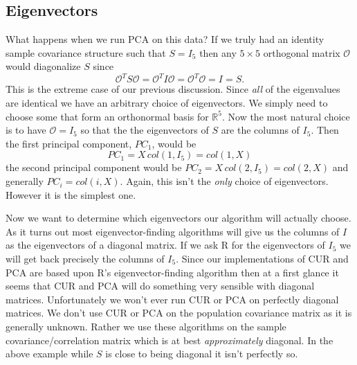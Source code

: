 \documentclass{book}
\begin{document}
\subsection{Eigenvectors}

What happens when we run PCA on this data? If we truly had an identity sample covariance structure such that $S=I_5$ then any $5 \times 5$ orthogonal matrix $\mathscr{O}$ would diagonalize $S$ since
$$
\mathscr{O}^TS\mathscr{O}=\mathscr{O}^TI\mathscr{O}=\mathscr{O}^T\mathscr{O}=I=S.
$$
This is the extreme case of our previous discussion. Since \emph{all} of the eigenvalues are identical we have an arbitrary choice of eigenvectors. We simply need to choose some that form an orthonormal basis for $\mathbb{R}^5$. Now the most natural choice is to have $\mathscr{O}=I_5$ so that the the eigenvectors of $S$ are the columns of $I_5$. Then the first principal component, $PC_1$, would be
$$
PC_1=X\,col(1,I_5)=col(1,X)
$$
the second principal component would be $PC_2=X\,col(2,I_5)=col(2,X)$ and generally $PC_i=col(i,X)$. Again, this isn't the \emph{only} choice of eigenvectors. However it is the simplest one. 

Now we want to determine which eigenvectors our algorithm will actually choose. As it turns out most eigenvector-finding algorithms will give us the columns of $I$ as the eigenvectors of a diagonal matrix. If we ask R for the eigenvectors of $I_5$ we will get back precisely the columns of $I_5$. Since our implementations of CUR and PCA are based upon R's eigenvector-finding algorithm then at a first glance it seems that CUR and PCA will do something very sensible with diagonal matrices. Unfortunately we won't ever run CUR or PCA on perfectly diagonal matrices. We don't use CUR or PCA on the population covariance matrix as it is generally unknown. Rather we use these algorithms on the sample covariance/correlation matrix which is at best \emph{approximately} diagonal. In the above example while $S$ is close to being diagonal it isn't perfectly so. 
\end{document}
